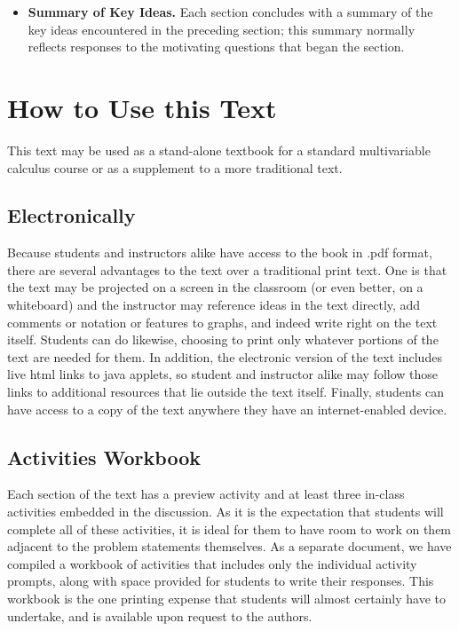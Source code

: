 \begin{itemize}
	\item {\bf Summary of Key Ideas.}  Each section concludes with a summary of the key ideas encountered in the preceding section; this summary normally reflects responses to the motivating questions that began the section.
\end{itemize}


\section*{How to Use this Text}

This text may be used as a stand-alone textbook for a standard multivariable calculus course or as a supplement to a more traditional text. 

\subsection*{Electronically}

Because students and instructors alike have access to the book in .pdf format, there are several advantages to the text over a traditional print text.  One is that the text may be projected on a screen in the classroom (or even better, on a whiteboard) and the instructor may reference ideas in the text directly, add comments or notation or features to graphs, and indeed write right on the text itself.  Students can do likewise, choosing to print only whatever portions of the text are needed for them.  In addition, the electronic version of the text includes live html links to java applets, so student and instructor alike may follow those links to additional resources that lie outside the text itself.  Finally, students can have access to a copy of the text anywhere they have an internet-enabled device.

\subsection*{Activities Workbook}

Each section of the text has a preview activity and at least three in-class activities embedded in the discussion.  As it is the expectation that students will complete all of these activities, it is ideal for them to have room to work on them adjacent to the problem statements themselves.  As a separate document, we have compiled a workbook of activities that includes only the individual activity prompts, along with space provided for students to write their responses.  This workbook is the one printing expense that students will almost certainly have to undertake, and is available upon request to the authors.  

